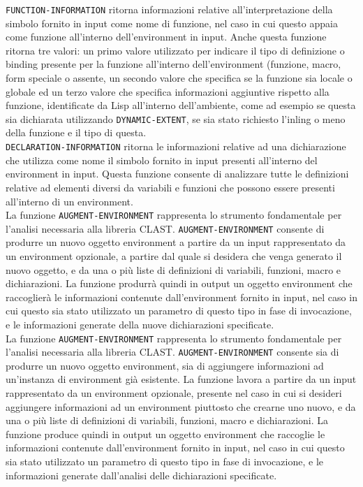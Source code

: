 \texttt{FUNCTION-INFORMATION} ritorna informazioni relative
all’interpretazione della simbolo fornito in input come nome di funzione, nel
caso in cui questo appaia come funzione all’interno dell’environment in input.
Anche questa funzione ritorna tre valori: un primo valore utilizzato per
indicare il tipo di definizione o binding presente per la funzione all’interno
dell’environment (funzione, macro, form speciale o assente, un secondo valore
che specifica se la funzione sia locale o globale ed un terzo valore che
specifica informazioni aggiuntive rispetto alla funzione, identificate da Lisp
all’interno dell’ambiente, come ad esempio se questa sia dichiarata
utilizzando \texttt {DYNAMIC-EXTENT}, se sia stato richiesto l’inling o meno
della funzione e il tipo di questa.\\

\texttt{DECLARATION-INFORMATION} ritorna le informazioni relative ad una
dichiarazione che utilizza come nome il simbolo fornito in input presenti
all’interno del environment in input. Questa funzione consente di analizzare
tutte le definizioni relative ad elementi diversi da variabili e funzioni che
possono essere presenti all’interno di un environment.\\

La funzione \texttt{AUGMENT-ENVIRONMENT} rappresenta lo strumento fondamentale
per l’analisi necessaria alla libreria CLAST. \texttt{AUGMENT-ENVIRONMENT}
consente di produrre un nuovo oggetto environment a partire da un input
rappresentato da un environment opzionale, a partire dal quale si desidera che
venga generato il nuovo oggetto, e da una o più liste di definizioni di
variabili, funzioni, macro e dichiarazioni. La funzione produrrà quindi in
output un oggetto environment che raccoglierà le informazioni contenute
dall'environment fornito in input, nel caso in cui questo sia stato utilizzato
un parametro di questo tipo in fase di invocazione, e le informazioni generate
della nuove dichiarazioni specificate.\\

La funzione \texttt{AUGMENT-ENVIRONMENT} rappresenta lo strumento fondamentale
per l’analisi necessaria alla libreria CLAST. \texttt{AUGMENT-ENVIRONMENT}
consente sia di produrre un nuovo oggetto environment, sia di aggiungere
informazioni ad un'instanza di environment già esistente. La funzione lavora a
partire da un input rappresentato da un environment opzionale, presente nel
caso in cui si desideri aggiungere informazioni ad un environment piuttosto
che crearne uno nuovo, e da una o più liste di definizioni di variabili,
funzioni, macro e dichiarazioni. La funzione produce quindi in output un
oggetto environment che raccoglie le informazioni contenute dall'environment
fornito in input, nel caso in cui questo sia stato utilizzato un parametro di
questo tipo in fase di invocazione, e le informazioni generate dall'analisi
delle dichiarazioni specificate.\\

